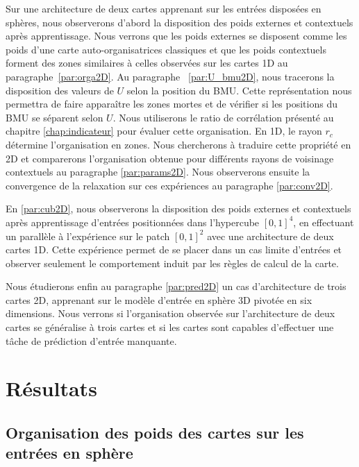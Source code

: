 \documentclass[../main]{subfiles}
\begin{document}
Sur une architecture de deux cartes apprenant sur les entrées disposées en sphères, nous observerons d'abord la disposition des poids externes et contextuels après apprentissage. Nous verrons que les poids externes se disposent comme les poids d'une carte auto-organisatrices classiques et que les poids contextuels forment des zones similaires à celles observées sur les cartes 1D au paragraphe~\ref{par:orga2D}.
Au paragraphe ~\ref{par:U_bmu2D}, nous tracerons la disposition des valeurs de $U$ selon la position du BMU. Cette représentation nous permettra de faire apparaître les zones mortes et de vérifier si les positions du BMU se séparent selon $U$. Nous utiliserons le ratio de corrélation présenté au chapitre \ref{chap:indicateur} pour évaluer cette organisation.
En 1D, le rayon $r_c$ détermine l'organisation en zones. Nous chercherons à traduire cette propriété en 2D et comparerons l'organisation obtenue pour différents rayons de voisinage contextuels au paragraphe \ref{par:params2D}.
Nous observerons ensuite la convergence de la relaxation sur ces expériences au paragraphe \ref{par:conv2D}.

En \ref{par:cub2D}, nous observerons la disposition des poids externes et contextuels après apprentissage d'entrées positionnées dans l'hypercube $[0,1]^4$, en effectuant un parallèle à l'expérience sur le patch $[0,1]^2$ avec une architecture de deux cartes 1D. Cette expérience permet de se placer dans un cas limite d'entrées et observer seulement le comportement induit par les règles de calcul de la carte.



Nous étudierons enfin au paragraphe \ref{par:pred2D} un cas d'architecture de trois cartes 2D, apprenant sur le modèle d'entrée en sphère 3D pivotée en six dimensions. Nous verrons si l'organisation observée sur l'architecture de deux cartes se généralise à trois cartes et si les cartes sont capables d'effectuer une tâche de prédiction d'entrée manquante.

\section{Résultats}

\subsection{Organisation des poids des cartes sur les entrées en sphère \label{par:orga2D}}
\end{document}
